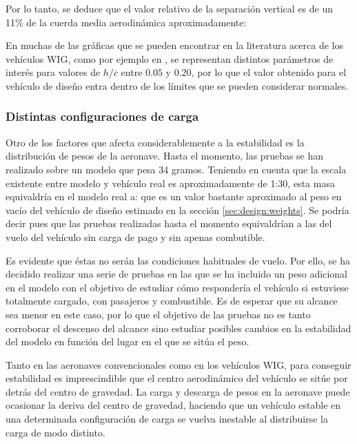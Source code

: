 Por lo tanto, se deduce que el valor relativo de la separación vertical es de un 11\% de la cuerda media aerodinámica aproximadamente:

En muchas de las gráficas que se pueden encontrar en la literatura acerca de los vehículos WIG, como por ejemplo en \cite{ref:wigpaper}, se representan distintos parámetros de interés para valores de $h/\overline{c}$ entre $0.05$ y $0.20$, por lo que el valor obtenido para el vehículo de diseño entra dentro de los límites que se pueden considerar normales.



\subsubsection{Distintas configuraciones de carga}
\label{sec:tests:results:weights}

Otro de los factores que afecta considerablemente a la estabilidad es la distribución de pesos de la aeronave. Hasta el momento, las pruebas se han realizado sobre un modelo que pesa 34 gramos. Teniendo en cuenta que la escala existente entre modelo y vehículo real es aproximadamente de 1:30, esta masa equivaldría en el modelo real a:
que es un valor bastante aproximado al peso en vacío del vehículo de diseño estimado en la sección \ref{sec:design:weights}. Se podría decir pues que las pruebas realizadas hasta el momento equivaldrían a las del vuelo del vehículo sin carga de pago y sin apenas combutible.

Es evidente que éstas no serán las condiciones habituales de vuelo. Por ello, se ha decidido realizar una serie de pruebas en las que se ha incluido un peso adicional en el modelo con el objetivo de estudiar cómo respondería el vehículo si estuviese totalmente cargado, con pasajeros y combustible. Es de esperar que su alcance sea menor en este caso, por lo que el objetivo de las pruebas no es tanto corroborar el descenso del alcance sino estudiar posibles cambios en la estabilidad del modelo en función del lugar en el que se sitúa el peso.

Tanto en las aeronaves convencionales como en los vehículos WIG, para conseguir estabilidad es imprescindible que el centro aerodinámico del vehículo se sitúe por detrás del centro de gravedad. La carga y descarga de pesos en la aeronave puede ocasionar la deriva del centro de gravedad, haciendo que un vehículo estable en una determinada configuración de carga se vuelva inestable al distribuirse la carga de modo distinto.

